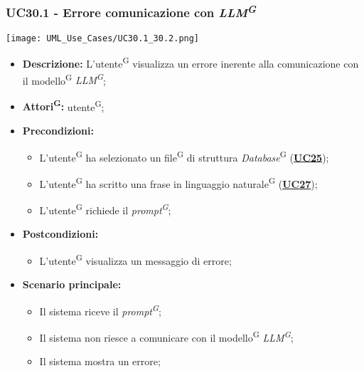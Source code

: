 \subsubsection{UC30.1 - Errore comunicazione con \textit{LLM\textsuperscript{G}}}
\label{sec:UC30.1}
\texttt{[image: UML\_Use\_Cases/UC30.1\_30.2.png]}
\begin{itemize}
	\item \textbf{Descrizione:} L’utente\textsuperscript{G} visualizza un errore inerente alla comunicazione con il modello\textsuperscript{G} \textit{LLM\textsuperscript{G}};
	\item \textbf{Attori\textsuperscript{G}:} utente\textsuperscript{G};
	\item \textbf{Precondizioni:} 
	\begin{itemize}
		\item L’utente\textsuperscript{G} ha selezionato un file\textsuperscript{G} di struttura \textit{Database}\textsuperscript{G} (\hyperref[sec:UC25]{\textbf{UC25}});
		\item L’utente\textsuperscript{G} ha scritto una frase in linguaggio naturale\textsuperscript{G} (\hyperref[sec:UC27]{\textbf{UC27}});
		\item L’utente\textsuperscript{G} richiede il \textit{prompt\textsuperscript{G}};
	\end{itemize}
	\item \textbf{Postcondizioni:} 
	\begin{itemize}
		\item L’utente\textsuperscript{G} visualizza un messaggio di errore;
	\end{itemize}
	\item \textbf{Scenario principale:} 
	\begin{itemize}
		\item Il sistema riceve il \textit{prompt\textsuperscript{G}};
		\item Il sistema non riesce a comunicare con il modello\textsuperscript{G} \textit{LLM\textsuperscript{G}};
		\item Il sistema mostra un errore;
	\end{itemize}
\end{itemize}

